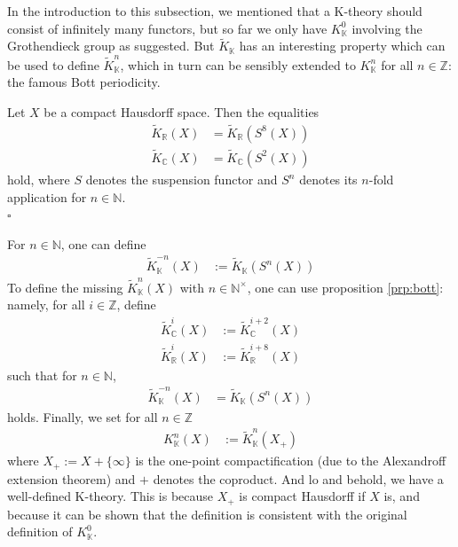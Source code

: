 In the introduction to this subsection, we mentioned that a K-theory should consist of infinitely many functors, but so far we only have $K_{\mathbb{K}}^{0}$ involving the Grothendieck group as suggested.
But $\tilde{K}_{\mathbb{K}}$ has an interesting property which can be used to define $\tilde{K}_{\mathbb{K}}^{n}$, which in turn can be sensibly extended to $K_{\mathbb{K}}^{n}$ for all $n \in \mathbb{Z}$: the famous Bott periodicity.
\\
\begin{prp}
\label{prp:bott}
Let $X$ be a compact Hausdorff space.
Then the equalities
\begin{align*}
  \tilde{K}_{\mathbb{R}}(X)
  &=
  \tilde{K}_{\mathbb{R}}(S^{8}(X))
  \\
  \tilde{K}_{\mathbb{C}}(X)
  &=
  \tilde{K}_{\mathbb{C}}(S^{2}(X))
\end{align*}
hold, where $S$ denotes the suspension functor and $S^{n}$ denotes its $n$-fold application for $n \in \mathbb{N}$.
\\
\phantom{proven}
\hfill
$\square$
\end{prp}
For $n \in \mathbb{N}$, one can define
\begin{align*}
  \tilde{K}_{\mathbb{K}}^{-n}(X)
  &:=
  \tilde{K}_{\mathbb{K}}(S^{n}(X))
\end{align*}
To define the missing $\tilde{K}_{\mathbb{K}}^{n}(X)$ with $n \in \mathbb{N}^{\times}$, one can use proposition \ref{prp:bott}: namely, for all $i \in \mathbb{Z}$, define
\begin{align*}
  \tilde{K}_{\mathbb{C}}^{i}(X)
  &:=
  \tilde{K}_{\mathbb{C}}^{i+2}(X)
  \\
  \tilde{K}_{\mathbb{R}}^{i}(X)
  &:=
  \tilde{K}_{\mathbb{R}}^{i+8}(X)
\end{align*}
such that for $n \in \mathbb{N}$, 
\begin{align*}
  \tilde{K}_{\mathbb{K}}^{-n}(X)
  &=
  \tilde{K}_{\mathbb{K}}(S^{n}(X))
\end{align*}
holds.
Finally, we set for all $n \in \mathbb{Z}$
\begin{align*}
  K_{\mathbb{K}}^{n}(X)
  &:=
  \tilde{K}_{\mathbb{K}}^{n}(X_{+})
\end{align*}
where $X_{+} := X + \lbrace \infty \rbrace$ is the one-point compactification (due to the Alexandroff extension theorem) and $+$ denotes the coproduct.
And lo and behold, we have a well-defined K-theory.
This is because $X_{+}$ is compact Hausdorff if $X$ is, and because it can be shown that the definition is consistent with the original definition of $K_{\mathbb{K}}^{0}$.
